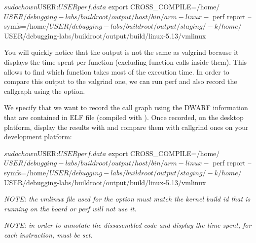 \begin{bashinput}
$ sudo chown $USER:$USER perf.data
$ export CROSS_COMPILE=/home/$USER/debugging-labs/buildroot/output/host/bin/arm-linux-
$ perf report --symfs=/home/$USER/debugging-labs/buildroot/output/staging/
    -k /home/$USER/debugging-labs/buildroot/output/build/linux-5.13/vmlinux
\end{bashinput}

You will quickly notice that the output is not the same as valgrind because it
displays the time spent per function (excluding function calls inside them).
This allows to find which function takes most of the execution time. In order to
compare this output to the valgrind one, we can run perf and also record the
callgraph using the  option.


We specify that we want to record the call graph using the DWARF information
that are contained in ELF file (compiled with ). Once recorded, on the
desktop platform, display the results with  and compare them
with callgrind ones on your development platform:

\begin{bashinput}
$ sudo chown $USER:$USER perf.data
$ export CROSS_COMPILE=/home/$USER/debugging-labs/buildroot/output/host/bin/arm-linux-
$ perf report --symfs=/home/$USER/debugging-labs/buildroot/output/staging/
   -k /home/$USER/debugging-labs/buildroot/output/build/linux-5.13/vmlinux
\end{bashinput}

{\em NOTE: the vmlinux file used for the  option must match the kernel
build id that is running on the board or perf will not use it.}

{\em NOTE: in order to annotate the dissasembled code and display the time spent,
for each instruction,  must be set.}
